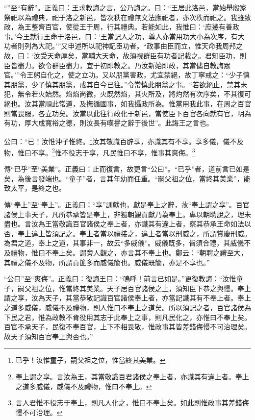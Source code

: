 {\noindent\shu{}\fzkt “”至“有辭”。正義曰：王求教誨之言，公乃誨之。曰：“王居此洛邑，當始舉殷家祭祀以為禮典，祀于洛之新邑，皆次秩在禮無文法應祀者，亦次秩而祀之。我雖致政，為王整齊百官，使從王于周，行其禮典。若能如此，我惟曰：‘庶幾有善政事。’今王就行王命于洛邑，曰：‘王當記人之功，尊人亦當用功大小為次序，有大功者則列為大祀。’”又申述所以祀神記臣功者。“政事由臣而立，惟天命我周邦之故，曰：‘汝受天命厚矣，當輔大天命，故須視群臣有功者記載之。君知臣功，則臣皆盡力。欲令群臣盡力，宜于初即教之。乃汝新始即政，其當儘自教誨眾官。’”令王躬自化之，使之立功。又以朋黨害政，尤宜禁絕，故丁寧戒之：“少子慎其朋黨，少子慎其朋黨，戒其自今已往。”令常慎此朋黨之事。“若欲絕止，禁其未犯，無令若火始然。焰焰尚微，火既然焰，其火所及，將灼然有次序矣，不其復可絕也。汝其當順此常道，及撫循國事，如我攝政所為。惟當用我此事，在周之百官則當畏服，各立功矣。汝當以此往行政化于新邑，當使臣下百官各向就有官，明為有功，厚大成寬裕之德，則汝長有嘆譽之辭于後世”。此誨王之言也。 \par}

公曰：“已！汝惟沖子惟終。\footnote{已乎！汝惟童子，嗣父祖之位，惟當終其美業。}汝其敬識百辟享，亦識其有不享。享多儀，儀不及物，惟曰不享。\footnote{奉上謂之享。言汝為王，其當敬識百君諸侯之奉上者，亦識其有違上者。奉上之道多威儀，威儀不及禮物，惟曰不奉上。}惟不役志于享，凡民惟曰不享，惟事其爽侮。\footnote{言人君惟不役志于奉上，則凡人化之，惟曰不奉上矣。如此則惟政事其差錯侮慢不可治理。}


{\noindent\zhuan{}\fzbyks 傳“已乎”至“美業”。正義曰：止而復言，故更言“公曰”。“已乎”者，道前言已如是矣，為後言發端也。“童子”者，言其年幼而任重。“嗣父祖之位，當終其美業”，能致太平，是終之也。 \par}

{\noindent\zhuan{}\fzbyks 傳“奉上”至“奉上”。正義曰：“享”訓獻也，獻是奉上之辭，故“奉上謂之享”。百官諸侯上事天子，凡所恭承皆是奉上，非獨朝覲貢獻乃為奉上。專以朝聘說之，理未盡也。言汝為王當敬識百官諸侯之奉上者，亦識其有違上者，察其恭承王命如法以否，奉上違上皆須記之。奉上者當以禮接之，違上者當以刑威之，所謂賞慶刑威。為君之道，奉上之道，其事非一，故云“多威儀”。威儀既多，皆須合禮，其威儀不及禮物，惟曰不奉上矣。謂旁人觀之，亦言其不奉上也。鄭云：“朝聘之禮至大，其禮之儀不及物，所謂貢篚多而威儀簡也。威儀既簡，亦是不享也。” \par}

{\noindent\shu{}\fzkt “公曰”至“爽侮”。正義曰：復誨王曰：“嗚呼！前言已如是。”更復教誨：“汝惟童子，嗣父祖之位，惟當終其美業。天子居百官諸侯之上，須知臣下恭之與慢。奉上謂之享，汝為天子，其當恭敬記識百官諸侯奉上者，亦當記識其有不奉上者。奉上之道多威儀，威儀不及禮物，則人惟曰不奉上之道矣。所以須記之者，百官諸侯為下民之君，惟為政教不肯役用其志于此奉上之事，則凡民化之，亦惟曰不奉上矣。百官不承天子，民復不奉百官，上下不相畏敬，惟政事其皆差錯侮慢不可治理矣。故天子須知百官奉上與否也。” \par}

